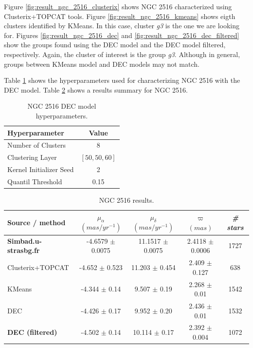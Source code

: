 \documentclass[11pt, a4paper, english]{book}
\begin{document}
\newpage

Figure \ref{fig:result_ngc_2516_clusterix} shows NGC 2516 characterized using Clusterix+TOPCAT tools.
Figure \ref{fig:result_ngc_2516_kmeans} shows eigth clusters identified by KMeans.
In this case, cluster \emph{g3} is the one we are looking for.
Figures \ref{fig:result_ngc_2516_dec} and \ref{fig:result_ngc_2516_dec_filtered}
show the groups found using the DEC model and the DEC model filtered, respectively.
Again, the cluster of interest is the group \emph{g3}.
Although in general, groups between KMeans model and DEC models may not match.

Table \ref{tab:hyperparameters_ngc_2516} shows the hyperparameters used for characterizing NGC 2516
with the DEC model. Table \ref{tab:results_ngc_2516} shows a results summary for NGC 2516.

\vfill

\begin{table}[h]
  \begin{center}
    \begin{tabular}{l|c}
      \textbf{Hyperparameter} & \textbf{Value} \\
      \hline
      Number of Clusters & 8 \\
      Clustering Layer & $\left[ 50, 50, 60 \right]$ \\
      Kernel Initializer Seed & 2 \\
      Quantil Threshold & 0.15 \\
    \end{tabular}
    \caption{NGC 2516 DEC model hyperparameters.}
    \label{tab:hyperparameters_ngc_2516}
  \end{center}
\end{table}

\vfill

\begin{table}[h]
  \begin{center}
    \begin{tabular}{l|c|c|c|c}
      \textbf{Source / method} & \emph{$\mu_{\alpha}$ $(mas/yr^{-1})$} & \emph{$\mu_{\delta}$ $(mas/yr^{-1})$} & \emph{$\varpi$ $(mas)$} & \emph{\# stars} \\
      \hline
      \textbf{Simbad.u-strasbg.fr} & -4.6579 $\pm$ 0.0075 & 11.1517 $\pm$ 0.0075 & 2.4118 $\pm$ 0.0006 & 1727 \\
      Clusterix+TOPCAT & -4.652 $\pm$ 0.523 & 11.203 $\pm$ 0.454 & 2.409 $\pm$ 0.127 & 638 \\
      KMeans & -4.344 $\pm$ 0.14 & 9.507 $\pm$ 0.19 & 2.268 $\pm$ 0.01 & 1542 \\
      DEC & -4.426 $\pm$ 0.17 & 9.952 $\pm$ 0.20 & 2.436 $\pm$ 0.01 & 1532 \\
      \textbf{DEC (filtered)} & -4.502 $\pm$ 0.14 & 10.114 $\pm$ 0.17 & 2.392 $\pm$ 0.004 & 1072 \\
    \end{tabular}
    \caption{NGC 2516 results.}
    \label{tab:results_ngc_2516}
  \end{center}
\end{table}
\end{document}
